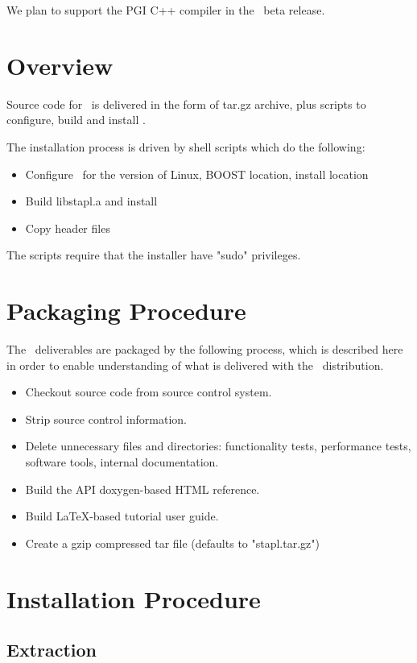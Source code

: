 \documentclass{report}
\begin{document}
We plan to support the PGI C++ compiler in the \stapl\ beta release.

\section{Overview}

Source code for \stapl\ is delivered in the form of tar.gz archive,
plus scripts to configure, build and install \stapl.

The installation process is driven by shell scripts which do the following:

\begin{itemize}
\item
Configure \stapl\ for the version of Linux, BOOST location, install location
\item
Build libstapl.a and install
\item
Copy header files
\end{itemize}

\noindent
The scripts require that the installer have "sudo" privileges.

\section{Packaging Procedure}

The \stapl\ deliverables are packaged by the following process,
which is described here in order to enable understanding of
what is delivered with the \stapl\ distribution.  

\begin{itemize}
\item
Checkout source code from source control system.
\item
Strip source control information.
\item
Delete unnecessary files and directories: functionality tests, 
performance tests, software tools, internal documentation.
\item
Build the API doxygen-based HTML reference.
\item
Build LaTeX-based tutorial user guide.
\item
Create a gzip compressed tar file (defaults to "stapl.tar.gz")
\end{itemize}

\section{Installation Procedure}

\subsection{Extraction}
\end{document}
